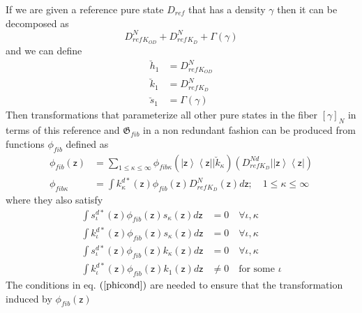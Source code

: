 \documentclass[aps,preprint]{revtex4}%
\begin{document}
If we are given a reference pure state $D_{ref}$ that has a density $\gamma$
then it can be decomposed as
\begin{equation}
D_{ref}^{N}{}_{K_{OD}}+D_{ref}^{N}{}_{K_{D}}+\Gamma\left(  \gamma\right)
\end{equation}
and we can define
\begin{align}
\breve{h}_{1}  &  =D_{ref}^{N}{}_{K_{OD}}\nonumber\\
\breve{k}_{1}  &  =D_{ref}^{N}{}_{K_{D}}\nonumber\\
\breve{s}_{1}  &  =\Gamma\left(  \gamma\right)
\end{align}
Then transformations that parameterize all other pure states in the fiber
$\left[  \gamma\right]  _{N}$ in terms of this reference and $\mathfrak{G}%
_{fib}$ in a non redundant fashion can be produced from functions $\phi_{fib}$
defined as
\begin{align}
\phi_{fib}\left(  \mathsf{z}\right)   &  =\sum_{1\leq\kappa\leq\infty}%
\phi_{fib\kappa}\left(  \left|  \mathsf{z}\right\rangle \left\langle
\mathsf{z}\right|  |\breve{k}_{\kappa}\right)  \left(  D_{refK_{D}}%
^{Nd}|\left|  \mathsf{z}\right\rangle \left\langle \mathsf{z}\right|  \right)
\nonumber\\
\phi_{fib\kappa}  &  =\int k_{\kappa}^{d\ast}\left(  \mathsf{z}\right)
\phi_{fib}\left(  \mathsf{z}\right)  D_{ref}^{N}{}_{K_{D}}\left(
\mathsf{z}\right)  d\mathsf{z};\quad1\leq\kappa\leq\infty\label{refkd}%
\end{align}
where they also satisfy
\begin{align}
\int s_{\iota}^{d\ast}\left(  \mathsf{z}\right)  \phi_{fib}\left(
\mathsf{z}\right)  s_{\kappa}\left(  \mathsf{z}\right)  d\mathsf{z}  &
=0\quad\forall\iota,\kappa\nonumber\\
\int k_{\iota}^{d\ast}\left(  \mathsf{z}\right)  \phi_{fib}\left(
\mathsf{z}\right)  s_{\kappa}\left(  \mathsf{z}\right)  d\mathsf{z}  &
=0\quad\forall\iota,\kappa\nonumber\\
\int s_{\iota}^{d\ast}\left(  \mathsf{z}\right)  \phi_{fib}\left(
\mathsf{z}\right)  k_{\kappa}\left(  \mathsf{z}\right)  d\mathsf{z}  &
=0\quad\forall\iota,\kappa\nonumber\\
\int k_{\iota}^{d\ast}\left(  \mathsf{z}\right)  \phi_{fib}\left(
\mathsf{z}\right)  k_{1}\left(  \mathsf{z}\right)  d\mathsf{z}  &  \neq
0\quad\text{for some }\iota\label{phicond}%
\end{align}
The conditions in eq. $\left(  \ref{phicond}\right)  $ are needed to ensure
that the transformation induced by $\phi_{fib}\left(  \mathsf{z}\right)  $
\end{document}
